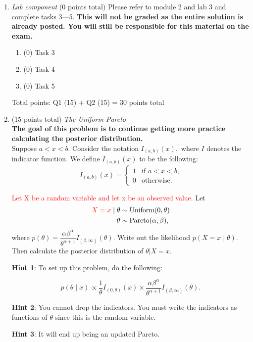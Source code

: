 \documentclass{article}
\begin{document}
\begin{enumerate}
\item {\em Lab component} 
  (0 points total) Please refer to module 2 and lab 3 and complete tasks 3---5. \textbf{This will not be graded as the entire solution is already posted. You will still be responsible for this material on the exam.}
  \begin{enumerate}
  \item (0) Task 3
  \item (0) Task 4
  \item (0) Task 5
  \end{enumerate}
  
  \newpage
  
Total points: Q1 (15) + Q2 (15)  = 30 points total
  
\item (15 points total) {\em The Uniform-Pareto} \\
\textbf{The goal of this problem is to continue getting more practice calculating the posterior distribution.}\\
Suppose $a < x < b.$ Consider the notation
$I_{(a,b)}(x),$ where $I$ denotes the indicator function. We define $I_{(a,b)}(x)$ to be the following:
$$
I_{(a,b)}(x)=
\begin{cases} 
1 & \text{if $a < x < b$,}
\\
0 &\text{otherwise.}
\end{cases}
$$

\textcolor{red}{Let X be a random variable and let x be an observed value.}
Let 
\begin{align*}
\textcolor{red}{X=x} \mid \theta &\sim \text{Uniform}(0,\theta)\\
\theta &\sim \text{Pareto}(\alpha,\beta),
\end{align*}
where $p(\theta) = \dfrac{\alpha \beta^\alpha}{\theta^{\alpha +1}}I_{(\beta,\infty)}(\theta).$
Write out the likelihood $p(X=x\mid \theta).$ Then calculate the posterior distribution of $\theta|X=x.$  

\textbf{Hint 1}: To set up this problem, do the following:

$$p(\theta \mid x) \propto \frac{1}{\theta} I_{(0,\theta)}(x)
\times 
\frac{\alpha \beta^{\alpha}}
{\theta^{\alpha + 1}}
I_{(\beta, \infty)}(\theta).$$

\textbf{Hint 2}: You cannot drop the indicators. You must write the indicators as functions of $\theta$ since this is the random variable. 

\textbf{Hint 3}: It will end up being an updated Pareto. 


\end{enumerate}
\end{document}
